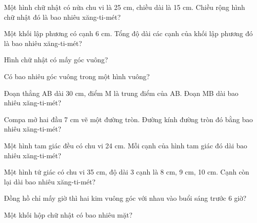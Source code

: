\begin{ex}
Một hình chữ nhật có nửa chu vi là 25 cm, chiều dài là 15 cm. Chiều rộng hình chữ nhật đó là bao nhiêu xăng-ti-mét?
\end{ex}

\begin{ex}
Một khối lập phương có cạnh 6 cm. Tổng độ dài các cạnh của khối lập phương đó là bao nhiêu xăng-ti-mét?
\end{ex}

\begin{ex}
Hình chữ nhật có mấy góc vuông?
\end{ex}

\begin{ex}
Có bao nhiêu góc vuông trong một hình vuông?
\end{ex}

\begin{ex}
Đoạn thẳng AB dài 30 cm, điểm M là trung điểm của AB. Đoạn MB dài bao nhiêu xăng-ti-mét?
\end{ex}

\begin{ex}
Compa mở hai đầu 7 cm vẽ một đường tròn. Đường kính đường tròn đó bằng bao nhiêu xăng-ti-mét?
\end{ex}

\begin{ex}
Một hình tam giác đều có chu vi 24 cm. Mỗi cạnh của hình tam giác đó dài bao nhiêu xăng-ti-mét?
\end{ex}

\begin{ex}
Một hình tứ giác có chu vi 35 cm, độ dài 3 cạnh là 8 cm, 9 cm, 10 cm. Cạnh còn lại dài bao nhiêu xăng-ti-mét?
\end{ex}

\begin{ex}
Đồng hồ chỉ mấy giờ thì hai kim vuông góc với nhau vào buổi sáng trước 6 giờ?
\end{ex}

\begin{ex}
Một khối hộp chữ nhật có bao nhiêu mặt?
\end{ex}


